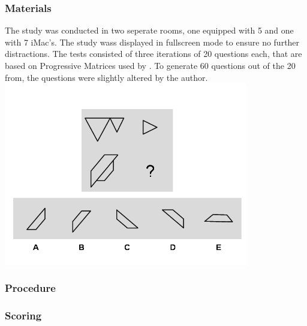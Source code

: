 \subsubsection{Materials}
The study was conducted in two seperate rooms, one equipped with 5 and one with 7 iMac's. The study wass displayed in fullscreen mode to ensure no further distractions.
The tests consisted of three iterations of 20 questions each, that are based on Progressive Matrices used by \Textcite{albuquerqueDoesGenderStereotype2017}.
To generate 60 questions out of the 20 from\textcite{albuquerqueDoesGenderStereotype2017}, the questions were slightly altered by the author.
\includegraphics[width=0.8\textwidth]{img/q-17.png}

\subsubsection{Procedure}
\subsubsection{Scoring}